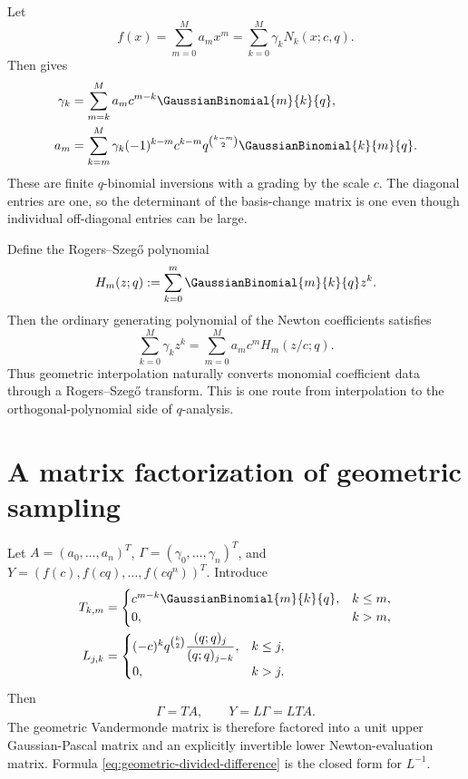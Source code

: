 \documentclass[11pt,oneside]{book}
\numberwithin{equation}{chapter}
\theoremstyle{definition}
\theoremstyle{remark}
\begin{document}
Let
\begin{equation}
 f(x)=\sum_{m=0}^M a_mx^m
     =\sum_{k=0}^M\gamma_kN_k(x;c,q).
 \label{eq:two-coordinate-expansions}
\end{equation}
Then  gives
\begin{align}
 \gamma_k
 &=\sum_{m=k}^M a_mc^{m-k}\GaussianBinomial{m}{k}{q},
 \label{eq:coeff-forward}\\
 a_m
 &=\sum_{k=m}^M\gamma_k(-1)^{k-m}c^{k-m}
 q^{\binom{k-m}{2}}\GaussianBinomial{k}{m}{q}.
 \label{eq:coeff-inverse}
\end{align}
These are finite $q$-binomial inversions with a grading by the scale $c$.
The diagonal entries are one, so the determinant of the basis-change matrix
is one even though individual off-diagonal entries can be large.

Define the Rogers--Szeg\H{o} polynomial
\begin{equation}
 H_m(z;q):=\sum_{k=0}^m\GaussianBinomial{m}{k}{q}z^k.
 \label{eq:rogers-szego}
\end{equation}
Then the ordinary generating polynomial of the Newton coefficients satisfies
\begin{equation}
 \sum_{k=0}^M\gamma_kz^k
 =\sum_{m=0}^Ma_mc^mH_m(z/c;q).
 \label{eq:rogers-szego-transform}
\end{equation}
Thus geometric interpolation naturally converts monomial coefficient data
through a Rogers--Szeg\H{o} transform.  This is one route from interpolation
to the orthogonal-polynomial side of $q$-analysis.

\section{A matrix factorization of geometric sampling}

Let $A=(a_0,\ldots,a_n)^T$, $\Gamma=(\gamma_0,\ldots,\gamma_n)^T$, and
$Y=(f(c),f(cq),\ldots,f(cq^n))^T$.  Introduce
\begin{align*}
 T_{k,m}&=\begin{cases}c^{m-k}\GaussianBinomial{m}{k}{q},&k\le m,\\0,&k>m,\end{cases}\\
 L_{j,k}&=\begin{cases}
 (-c)^kq^{\binom k2}\dfrac{(q;q)_j}{(q;q)_{j-k}},&k\le j,\\
 0,&k>j.
 \end{cases}
\end{align*}
Then
\begin{equation}
 \Gamma=TA,
 \qquad
 Y=L\Gamma=LTA.
 \label{eq:vandermonde-factorization}
\end{equation}
The geometric Vandermonde matrix is therefore factored into a unit upper
Gaussian-Pascal matrix and an explicitly invertible lower Newton-evaluation
matrix.  Formula \eqref{eq:geometric-divided-difference} is the closed form
for $L^{-1}$.
\end{document}
